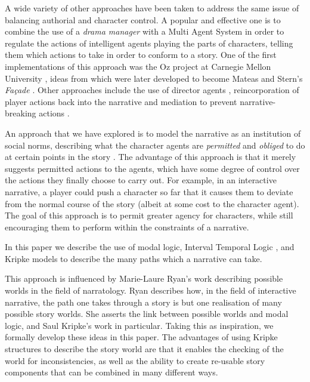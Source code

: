 \documentclass{llncs}
\begin{document}
A wide variety of other approaches have been taken to address the same issue of balancing authorial and character control. A popular and effective one is to combine the use of a \emph{drama manager} with a Multi Agent System in order to regulate the actions of intelligent agents playing the parts of characters, telling them which actions to take in order to conform to a story. One of the first implementations of this approach was the Oz project at Carnegie Mellon University \cite{bates1992virtual}, ideas from which were later developed to become Mateas and Stern's \emph{Fa\c{c}ade} \cite{mateas2003faccade}.
Other approaches include the use of director agents \cite{lee2011learning}, reincorporation of player actions back into the narrative \cite{tomaszewski2011use} and mediation to prevent narrative-breaking actions \cite{robertson2013modelling}.

An approach that we have explored is to model the narrative as an institution of social norms, describing what the character agents are \emph{permitted} and \emph{obliged} to do at certain points in the story \cite{thompson-et-al:2015}. The advantage of this approach is that it merely suggests permitted actions to the agents, which have some degree of control over the actions they finally choose to carry out. For example, in an interactive narrative, a player could push a character so far that it causes them to deviate from the normal course of the story (albeit at some cost to the character agent). The goal of this approach is to permit greater agency for characters, while still encouraging them to perform within the constraints of a narrative.

In this paper we describe the use of modal logic, Interval Temporal Logic \cite{della2013interval}, and Kripke models \cite{kripke1963semantical} to describe the many paths which a narrative can take.

This approach is influenced by Marie-Laure Ryan's work describing possible worlds \cite{ryan1991possible} in the field of narratology. Ryan describes how, in the field of interactive narrative, the path one takes through a story is but one realisation of many possible story worlds. She asserts the link between possible worlds and modal logic, and Saul Kripke's work in particular. Taking this as inspiration, we formally develop these ideas in this paper.
The advantages of using Kripke structures to describe the story world are that it enables the checking of the world for inconsistencies, as well as the ability to create re-usable story components that can be combined in many different ways.
\end{document}
